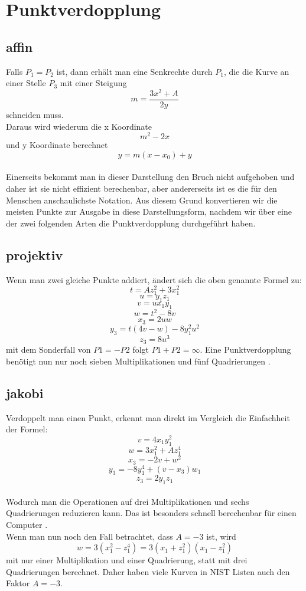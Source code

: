\section{Punktverdopplung}
\subsection{affin}
Falls \(P_1 = P_2\) ist, dann erhält man eine Senkrechte durch \(P_1\), die die Kurve an einer Stelle \(P_3\) mit einer Steigung \[m = \frac{3x^2+A}{2y}\] schneiden muss.\\
Daraus wird wiederum die x Koordinate \[m^2-2x\] und y Koordinate berechnet \[y = m(x - x_0)+y\]\\ Einerseits bekommt man in dieser Darstellung den Bruch nicht aufgehoben und daher ist sie nicht effizient berechenbar, aber andererseits ist es die für den Menschen anschaulichste Notation. Aus diesem Grund konvertieren wir die meisten Punkte zur Ausgabe in diese Darstellungsform, nachdem wir über eine der zwei folgenden Arten die Punktverdopplung durchgeführt haben.
\subsection{projektiv}
Wenn man zwei gleiche Punkte addiert, ändert sich die oben genannte Formel zu:
\[t = Az_1^2 + 3x_1^2\] \[u = y_1z_1\] \[v = ux_1y_1\] \[w = t^2 - 8v\] \[x_3 = 2uw\] \[y_3 = t(4v-w)- 8y_1^2u^2\] \[z_3 = 8u^3\] mit dem Sonderfall von \(P1 = -P2\) folgt \(P1 + P2 = \infty\). Eine Punktverdopplung benötigt nun nur noch sieben Multiplikationen und fünf Quadrierungen  \cite{Washington2003}.
\subsection{jakobi}
Verdoppelt man einen Punkt, erkennt man direkt im Vergleich die Einfachheit der Formel:
\[v = 4x_1y_1^2\] \[w = 3x_1^2 + Az_1^4\] \[x_3 = -2v + w^2\] \[y_3 = -8y_1^4 + (v-x_3)w_1\] \[z_3 = 2y_1z_1\]\\ 
Wodurch man die Operationen auf drei Multiplikationen und sechs Quadrierungen reduzieren kann. Das ist besonders schnell berechenbar für einen Computer \cite{Washington2003}.\\
Wenn man nun noch den Fall betrachtet, dass \(A = -3\) ist, wird \[w = 3(x_1^2 - z_1^4) = 3(x_1 + z_1^2)(x_1 - z_1^2)\] mit nur einer Multiplikation und einer Quadrierung, statt mit drei Quadrierungen berechnet. Daher haben viele Kurven in NIST Listen auch den Faktor \(A = -3\).